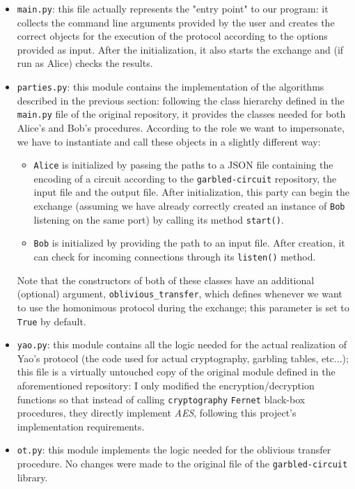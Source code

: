 \documentclass[12pt]{article}
\begin{document}
\begin{itemize}
  \item \texttt{main.py}: this file actually represents the "entry point" to our program: it collects the command line arguments provided by the user and creates the correct objects for the execution of the protocol according to the options provided as input. After the initialization, it also starts the exchange and (if run as Alice) checks the results.
  \item \texttt{parties.py}: this module contains the implementation of the algorithms described in the previous section: following the class hierarchy defined in the \texttt{main.py} file of the original repository, it provides the classes needed for both Alice's and Bob's procedures. According to the role we want to impersonate, we have to instantiate and call these objects in a slightly different way:
  \begin{itemize}
    \item \texttt{Alice} is initialized by passing the paths to a JSON file containing the encoding of a circuit according to the \texttt{garbled-circuit} repository, the input file and the output file. After initialization, this party can begin the exchange (assuming we have already correctly created an instance of \texttt{Bob} listening on the same port) by calling its method \texttt{start()}.
    \item \texttt{Bob} is initialized by providing the path to an input file. After creation, it can check for incoming connections through its \texttt{listen()} method.
  \end{itemize}
  Note that the constructors of both of these classes have an additional (optional) argument, \texttt{oblivious\_transfer}, which defines whenever we want to use the homonimous protocol during the exchange; this parameter is set to \texttt{True} by default.
  \item \texttt{yao.py}: this module contains all the logic needed for the actual realization of Yao's protocol (the code used for actual cryptography, garbling tables, etc...); this file is a virtually untouched copy of the original module defined in the aforementioned repository: I only modified the encryption/decryption functions so that instead of calling \texttt{cryptography} \cite{CRYPTO} \texttt{Fernet} black-box procedures, they directly implement \textit{AES}, following this project's implementation requirements.
  \item \texttt{ot.py}: this module implements the logic needed for the oblivious transfer procedure. No changes were made to the original file of the \texttt{garbled-circuit} library.

\end{itemize}
\end{document}

